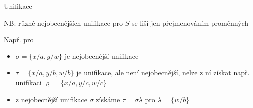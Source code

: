 \documentclass{beamer}
\begin{document}
\begin{frame}{Unifikace}
    
    \pause
    
    NB: různé nejobecnějších unifikace pro $S$ se liší jen přejmenováním proměnných\pause
    
    Např. pro \pause

    \begin{itemize}
        \item $\sigma=\{x/a,y/w\}$ je nejobecnější unifikace\pause
        \item $\tau=\{x/a,y/b,w/b\}$ je unifikace, ale není nejobecnější, nelze z ní získat např. unifikaci $\varrho=\{x/a, y/c, w/c\}$\pause
        \item z nejobecnější unifikace $\sigma$ získáme $\tau=\sigma\lambda$ pro $\lambda=\{w/b\}$
    \end{itemize}

\end{frame}
\end{document}
